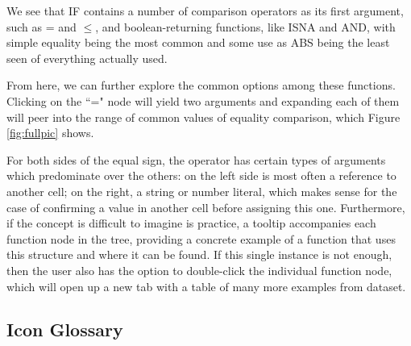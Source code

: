 \documentclass[conference]{IEEEtran}
\begin{document}
	We see that IF contains a number of comparison operators as its first argument,
	such as = and $\le$, and boolean-returning functions, like ISNA and AND, with
	simple equality being the most common and some use as ABS being the least seen
	of everything actually used. \par
	
	From here, we can further explore the common options among these functions.
	Clicking on the ``=" node will yield two arguments and expanding each of them
	will peer into the range of common values of equality comparison, which Figure
	\ref{fig:fullpic} shows. \par
	
	For both sides of the equal sign, the operator has certain types of arguments
	which predominate over the others: on the left side is most often a reference
	to another cell; on the right, a string or number literal, which makes sense
	for the case of confirming a value in another cell before assigning this one.
	Furthermore, if the concept is difficult to imagine is practice, a tooltip
	accompanies each function node in the tree, providing a concrete example of a
	function that uses this structure and where it can be found. If this single
	instance is not enough, then the user also has the option to double-click the
	individual function node, which will open up a new tab with a table of many
	more examples from dataset.
	
	\subsection{Icon Glossary}
	
\end{document}
